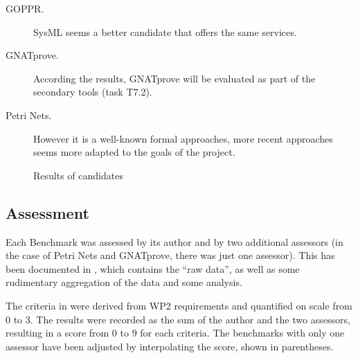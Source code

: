 \begin{description}
\item[GOPPR.] SysML seems a better candidate that offers the same services.
\item[GNATprove.] According the results, GNATprove will be evaluated as part of the secondary tools (task T7.2).
\item[Petri Nets.] However it is a well-known formal approaches, more recent approaches seems more adapted to the goals of the project.
\end{description}

 \begin{figure}
  \centering
  \caption{Results of candidates}
  \label{fig:results}
\end{figure}

\subsection{Assessment}
\label{sec:assessment}

Each Benchmark was assessed by its author and by two additional assessors (in the case of Petri Nets and GNATprove, there was just one assessor).  This has been documented in \citep{WP7_O719}, which contains the ``raw data'', as well as some rudimentary aggregation of the data and some analysis.

The criteria in \citep{WP7_O719} were derived from WP2 requirements and quantified on scale from 0 to 3.  The results were recorded as the sum of the author and the two assessors, resulting in a score from 0 to 9 for each criteria.  The benchmarks with only one assessor have been adjusted by interpolating the score, shown in parentheses.

